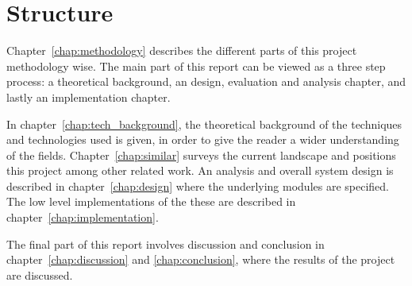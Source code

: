 \section{Structure}
  \label{sec:structure}

Chapter~\ref{chap:methodology} describes the different parts of this project methodology wise. The main part of this report can be viewed as a three step process: a theoretical background, an design, evaluation and analysis chapter, and lastly an implementation chapter.

In chapter~\ref{chap:tech_background}, the theoretical background of the techniques and technologies used is given, in order to give the reader a wider understanding of the fields. Chapter~\ref{chap:similar} surveys the current landscape and positions this project among other related work. An analysis and overall system design is described in chapter~\ref{chap:design} where the underlying modules are specified. The low level implementations of the these are described in chapter~\ref{chap:implementation}.

The final part of this report involves discussion and conclusion in chapter~\ref{chap:discussion} and \ref{chap:conclusion}, where the results of the project are discussed.
